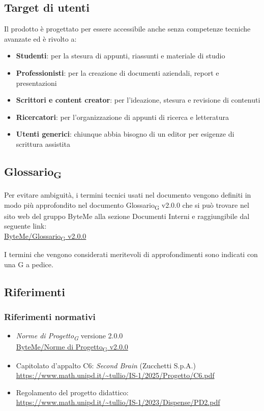\documentclass[11pt,a4paper]{article}
\newcommand{\gls}[1]{#1\textsubscript{G}}
\begin{document}
\subsection{Target di utenti}
Il prodotto è progettato per essere accessibile anche senza competenze tecniche avanzate ed è rivolto a:
\begin{itemize}
    \item \textbf{Studenti}: per la stesura di appunti, riassunti e materiale di studio
    \item \textbf{Professionisti}: per la creazione di documenti aziendali, report e presentazioni
    \item \textbf{Scrittori e content creator}: per l'ideazione, stesura e revisione di contenuti
    \item \textbf{Ricercatori}: per l'organizzazione di appunti di ricerca e letteratura
    \item \textbf{Utenti generici}: chiunque abbia bisogno di un editor per esigenze di scrittura assistita
\end{itemize}


\subsection{\gls{Glossario}}
Per evitare ambiguità, i termini tecnici usati nel documento vengono definiti in modo più approfondito nel documento \gls{Glossario} v2.0.0 che si può trovare nel sito web del gruppo ByteMe alla sezione Documenti Interni e raggiungibile dal seguente link:\\
\href{https://byteme25.github.io/ByteMe/files.html}{ByteMe/\gls{Glossario} v2.0.0}

I termini che vengono considerati meritevoli di approfondimenti sono indicati con una G a pedice.


\subsection{Riferimenti}
\subsubsection{Riferimenti normativi}
\begin{itemize}
  \item \textit{\gls{Norme di Progetto}} versione 2.0.0\\
  \href{https://byteme25.github.io/ByteMe/files.html}{ByteMe/\gls{Norme di Progetto} v2.0.0}
  \item Capitolato d'appalto C6: \textit{Second Brain} (Zucchetti S.p.A.)\\ \url{https://www.math.unipd.it/~tullio/IS-1/2025/Progetto/C6.pdf}
  \item Regolamento del progetto didattico:\\
        \url{https://www.math.unipd.it/~tullio/IS-1/2023/Dispense/PD2.pdf}
\end{itemize}
\end{document}
